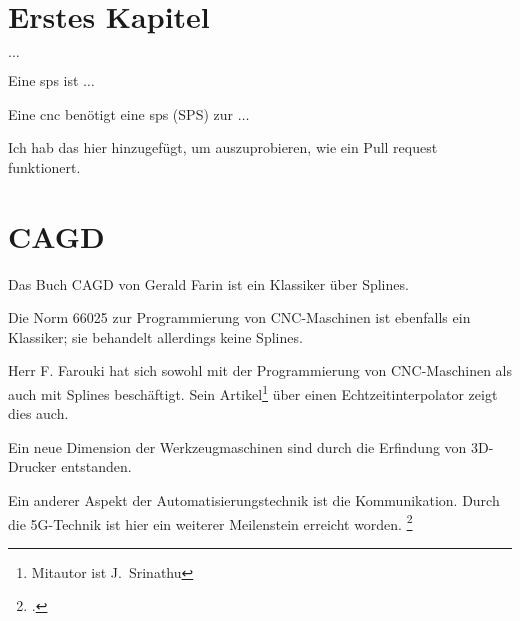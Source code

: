 %
%
%



\chapter{Erstes Kapitel}

$\ldots$

Eine \ac{sps} ist $\ldots$
\bigskip


Eine \ac{cnc} benötigt eine \ac{sps}  (SPS)  zur $\ldots$
    
    Ich hab das hier hinzugefügt, um auszuprobieren, wie ein Pull request funktionert.
    
    
\chapter{CAGD}

\blindtext

Das Buch CAGD von Gerald Farin ist ein Klassiker über Splines. \cite{Farin:2002}

\bigskip

Die Norm 66025 zur Programmierung von CNC-Maschinen ist ebenfalls ein Klassiker; sie behandelt allerdings keine Splines. \cite{DIN66025}

\bigskip

Herr F. Farouki hat sich sowohl mit der Programmierung von CNC-Maschinen als auch mit Splines beschäftigt. Sein Artikel\footnote{Mitautor ist J.~Srinathu} über einen Echtzeitinterpolator zeigt dies auch. \cite{Farouki:2017}

\bigskip

Ein neue Dimension der Werkzeugmaschinen sind durch die Erfindung von 3D-Drucker entstanden. \cite{Patent3D}

\bigskip


Ein anderer Aspekt der Automatisierungstechnik ist die Kommunikation. Durch die 5G-Technik ist hier ein
weiterer Meilenstein erreicht worden. \footcite{Zafeiropoulos:2020}


